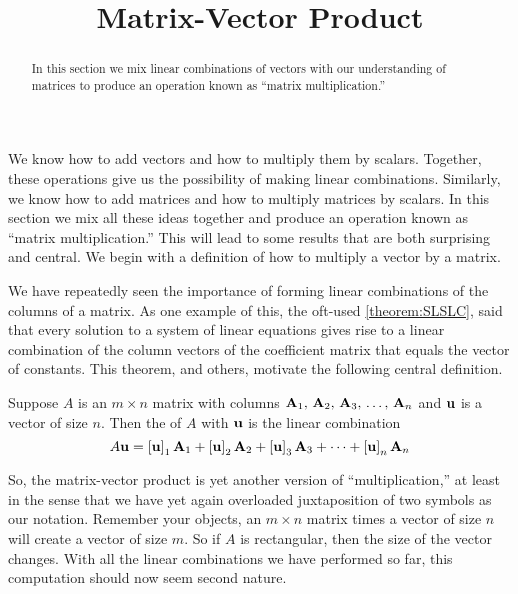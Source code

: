 \documentclass{ximera}
\title{Matrix-Vector Product}
\begin{document}
\begin{abstract}
  In this section we mix linear combinations of vectors with our
  understanding of matrices to produce an operation known as ``matrix
  multiplication.''
\end{abstract}
\maketitle

We know how to add vectors and how to multiply them by scalars.
Together, these operations give us the possibility of making linear
combinations.  Similarly, we know how to add matrices and how to
multiply matrices by scalars.  In this section we mix all these ideas
together and produce an operation known as ``matrix multiplication.''
This will lead to some results that are both surprising and central.
We begin with a definition of how to multiply a vector by a matrix.

We have repeatedly seen the importance of forming linear combinations
of the columns of a matrix.  As one example of this, the oft-used
\ref{theorem:SLSLC}, said that every solution to a system of linear
equations gives rise to a linear combination of the column vectors of
the coefficient matrix that equals the vector of constants.  This
theorem, and others, motivate the following central definition.


\begin{definition}

  Suppose $A$ is an $m\times n$ matrix with columns
  $\mathbf{A}_{1},\,\mathbf{A}_{2},\,\mathbf{A}_{3},\,\ldots,\,\mathbf{A}_{n}$ and $\mathbf{u}$ is a vector of size $n$.  Then
  the  of $A$ with $\mathbf{u}$ is
  the linear combination
  \[
    A\mathbf{u}=
    \left\lbrack\mathbf{u}\right\rbrack_{1}\mathbf{A}_1+
    \left\lbrack\mathbf{u}\right\rbrack_{2}\mathbf{A}_2+
    \left\lbrack\mathbf{u}\right\rbrack_{3}\mathbf{A}_3+
    \cdots+
    \left\lbrack\mathbf{u}\right\rbrack_{n}\mathbf{A}_n
  \]
\end{definition}

So, the matrix-vector product is yet another version of
``multiplication,'' at least in the sense that we have yet again
overloaded juxtaposition of two symbols as our notation.  Remember
your objects, an $m\times n$ matrix times a vector of size $n$ will
create a vector of size $m$.  So if $A$ is rectangular, then the size
of the vector changes.  With all the linear combinations we have
performed so far, this computation should now seem second nature.
\end{document}
